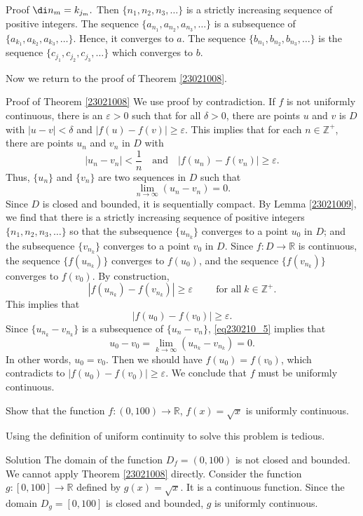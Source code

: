 \begin{example}
\begin{myproof}{Proof}
$\di n_m=k_{j_m}.$  Then $\{n_1, n_2, n_3, \ldots\}$ is a strictly increasing sequence of positive integers. The sequence $\{a_{n_1}, a_{n_2}, a_{n_3}, \ldots\}$ is a subsequence of $\{a_{k_1}, a_{k_2}, a_{k_3}, \ldots\}$. Hence, it converges to $a$. The sequence $\{b_{n_1}, b_{n_2}, b_{n_3}, \ldots\}$ is the sequence  $\{c_{j_1}, c_{j_2}, c_{j_3}, \ldots\}$ which converges to $b$.
\end{myproof}
Now we return to the proof of Theorem \ref{23021008}.
\begin{myproof}{\linkt Proof of Theorem \ref{23021008}}
We use proof by contradiction. If $f$ is not uniformly continuous,
there is an $\varepsilon>0$ such that for all $\delta>0$, there are points $u$ and $v$ is $D$ with $|u-v|<\delta$ and $|f(u)-f(v)|\geq\varepsilon$.
This implies that for each $n\in\mathbb{Z}^+$, there are points $u_n$ and $v_n$ in $D$ with 
\[\left|u_n-v_n\right|<\frac{1}{n}\quad \text{and}\quad\left|f(u_n)-f(v_n)\right|\geq\varepsilon.\]
Thus, $\{u_n\}$ and $\{v_n\}$ are two sequences in $D$ such that 
\begin{equation}\label{eq230210_5}\lim_{n\rightarrow\infty}(u_n-v_n)=0.\end{equation}
Since $D$ is closed and bounded, it is sequentially compact. By Lemma \ref{23021009}, we find that there is a strictly increasing sequence of positive integers $\{n_1, n_2, n_3,\ldots\}$ so that the subsequence $\{u_{n_k}\}$ converges to a point $u_0$ in $D$; and the subsequence $\{v_{n_k}\}$ converges to a point $v_0$ in $D$.  
 Since $f:D\to\mathbb{R}$ is continuous, the sequence $\{f(u_{n_k})\}$ converges to $f(u_0)$, and the sequence $\{f(v_{n_k})\}$  converges to $f(v_0)$.
By construction,
 \[|f(u_{n_k})-f(v_{n_k})|\geq \varepsilon\hspace{1cm}\text{for all}\;k\in\mathbb{Z}^+.\]
 This implies that
 \[|f(u_0)-f(v_0)|\geq \varepsilon.\]Since $\{u_{n_k}-v_{n_k}\}$ is a subsequence of $\{u_n-v_n\}$, \eqref{eq230210_5} implies that
\[u_0-v_0=\lim_{k\to\infty}\left(u_{n_k}-v_{n_k}\right)=0.\]
 In other words, $u_0=v_0$. Then we should have $f(u_0)=f(v_0)$, which contradicts to $|f(u_0)-f(v_0)|\geq\varepsilon$. 
We conclude that $f$ must be uniformly continuous.
\end{myproof}

\begin{example}{}
Show that the function $f:(0, 100)\rightarrow\mathbb{R}$, $f(x)=\sqrt{x}$ is uniformly continuous.
\end{example}
Using the definition of uniform continuity to solve this problem is tedious.
\begin{solution}{Solution}
The domain of the function $D_f=(0,100)$ is not closed and bounded. We cannot apply Theorem \ref{23021008} directly. Consider the function $g:[0,100]\rightarrow \mathbb{R}$ defined by $g(x)=\sqrt{x}$. It is a continuous function.
Since the domain $D_g=[0, 100]$ is closed and bounded, $g$ is uniformly continuous.


\end{solution}
\end{example}
